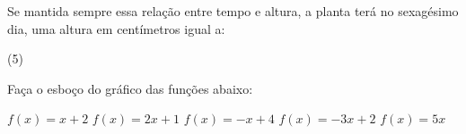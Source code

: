 \documentclass[a4paper,11pt,addpoints]{exam}
\begin{document}
\begin{questions}
    Se mantida sempre essa relação entre tempo e altura, a planta terá no
    sexagésimo dia, uma altura em centímetros igual a:

    \begin{tasks}(5)
    \end{tasks}

    \question[2]

    Faça o esboço do gráfico das funções abaixo:

    \begin{tasks}
        \task $f(x) = x + 2$
        \task $f(x) = 2x + 1$
        \task $f(x) = -x + 4$
        \task $f(x) = -3x + 2$
        \task $f(x) = 5x$
    \end{tasks}

\end{questions}
\end{document}
